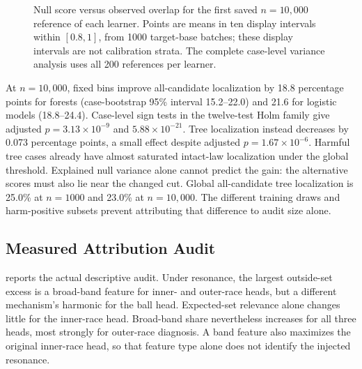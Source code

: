 \documentclass[conference]{IEEEtran}
\begin{document}
\begin{figure}[t]
\centering

\caption{Null score versus observed overlap for the first saved $n=10{,}000$ reference of each learner. Points are means in ten display intervals within $[0.8,1]$, from 1000 target-base batches; these display intervals are not calibration strata. The complete case-level variance analysis uses all 200 references per learner.}
\label{fig:overlap-score}
\end{figure}

\begin{table}[t]
\centering
\caption{Bin sensitivity at $n=10{,}000$. Variance explained is the percentage of target null-score variance explained by the fixed bins. Remaining columns are intact-law SHAP localization (\%) across all 200 candidates, with independent target residual calibration. Source thirds/fifths estimate edges from source overlap only.}
\label{tab:transfer-bins}
\footnotesize

\end{table}

At $n=10{,}000$, fixed bins improve all-candidate localization by 18.8 percentage points for forests (case-bootstrap 95\% interval 15.2--22.0) and 21.6 for logistic models (18.8--24.4). Case-level sign tests in the twelve-test Holm family give adjusted $p=3.13\times10^{-9}$ and $5.88\times10^{-21}$. Tree localization instead decreases by 0.073 percentage points, a small effect despite adjusted $p=1.67\times10^{-6}$. Harmful tree cases already have almost saturated intact-law localization under the global threshold. Explained null variance alone cannot predict the gain: the alternative scores must also lie near the changed cut. Global all-candidate tree localization is 25.0\% at $n=1000$ and 23.0\% at $n=10{,}000$. The different training draws and harm-positive subsets prevent attributing that difference to audit size alone.

\subsection{Measured Attribution Audit}
 reports the actual descriptive audit. Under resonance, the largest outside-set excess is a broad-band feature for inner- and outer-race heads, but a different mechanism's harmonic for the ball head. Expected-set relevance alone changes little for the inner-race head. Broad-band share nevertheless increases for all three heads, most strongly for outer-race diagnosis. A band feature also maximizes the original inner-race head, so that feature type alone does not identify the injected resonance.
\end{document}
